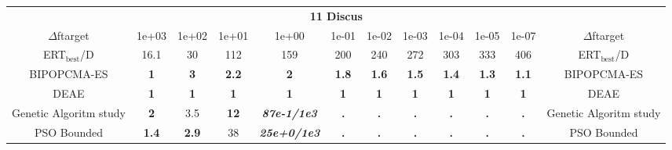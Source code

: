 \begin{tabular}{cccccccccccc}
 & \multicolumn{10}{c}{{\normalsize \textbf{11 Discus}}}\\
$\Delta$ftarget& 1e+03& 1e+02& 1e+01& 1e+00& 1e-01& 1e-02& 1e-03& 1e-04& 1e-05& 1e-07 & $\Delta$ftarget \\
ERT$_{\textrm{best}}$/D& 16.1& 30& 112& 159& 200& 240& 272& 303& 333& 406 & ERT$_{\textrm{best}}$/D \\
\hline
BIPOPCMA-ES & \textbf{1} & \textbf{3} & \textbf{2.2} & \textbf{2} & \textbf{1.8} & \textbf{1.6} & \textbf{1.5} & \textbf{1.4} & \textbf{1.3} & \textbf{1.1} & BIPOPCMA-ES \cite{add_an_entry_for_BIPOPCMA-ES_in_bbob.bib}\\
DEAE & \textbf{1} & \textbf{1} & \textbf{1} & \textbf{1} & \textbf{1} & \textbf{1} & \textbf{1} & \textbf{1} & \textbf{1} & \textbf{1} & DEAE \cite{add_an_entry_for_DEAE_in_bbob.bib}\\
Genetic Algoritm study & \textbf{2} & 3.5 & \textbf{12} & \textbf{\textit{87e-1}\textit{/1e3}} & \textbf{.} & \textbf{.} & \textbf{.} & \textbf{.} & \textbf{.} & \textbf{.} & Genetic Algoritm study \cite{add_an_entry_for_Genetic Algoritm study_in_bbob.bib}\\
PSO Bounded & \textbf{1.4} & \textbf{2.9} & 38 & \textbf{\textit{25e+0}\textit{/1e3}} & \textbf{.} & \textbf{.} & \textbf{.} & \textbf{.} & \textbf{.} & \textbf{.} & PSO Bounded \cite{add_an_entry_for_PSO Bounded_in_bbob.bib}
\end{tabular}
